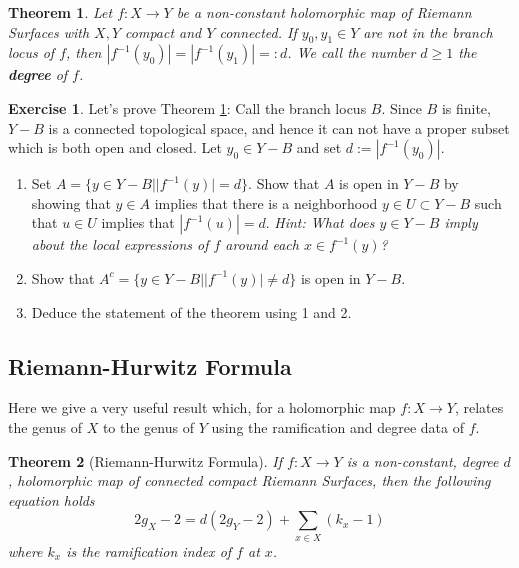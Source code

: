 \documentclass[12pt]{book}%
\theoremstyle{plain}
\newtheorem{theorem}{Theorem}[section]
\theoremstyle{definition}
\newtheorem{exercise}{Exercise}
\theoremstyle{remark}
\def\to{\rightarrow}
\begin{document}
\begin{theorem}
\label{degreeThm}
Let $f:X \to Y$ be a non-constant holomorphic map of Riemann Surfaces with $X,Y$ compact and $Y$ connected. If $y_0, y_1 \in Y$ are not in the branch locus of $f$, then $|f^{-1}(y_0)| = |f^{-1}(y_1)|=:d$. We call the number $d \geq 1$ the \textbf{degree} of $f$. 
\end{theorem}
\begin{exercise}
Let's prove Theorem \ref{degreeThm}: Call the branch locus $B$. Since $B$ is finite, $Y-B$ is a connected topological space, and hence it can not have a proper subset which is both open and closed. Let $y_0\in Y-B$ and set $d:=|f^{-1}(y_0)|$.
\begin{enumerate}
\item Set $A = \{y \in Y-B | |f^{-1}(y)| = d\}$. Show that $A$ is open in $Y-B$ by showing that $y\in A$ implies that there is a neighborhood $y\in U \subset Y-B$ such that $u \in U$ implies that $|f^{-1}(u)| = d$. \textit{Hint: What does $y\in Y-B$ imply about the local expressions of $f$ around each $x\in f^{-1}(y)$?}

\item Show that $A^c = \{y \in Y-B | |f^{-1}(y)| \neq d\}$ is open in $Y-B$.

\item Deduce the statement of the theorem using 1 and 2.
\end{enumerate}
\end{exercise}





\subsection{Riemann-Hurwitz Formula}

Here we give a very useful result which, for a holomorphic map $f:X \to Y$, relates the genus of $X$ to the genus of $Y$ using the ramification and degree data of $f$.

\begin{theorem}[Riemann-Hurwitz Formula]
\label{riemannHurwitzFormula}
If $f:X \to Y$ is a non-constant, degree $d$, holomorphic map of connected compact Riemann Surfaces, then the following equation holds
\[
2g_X-2 = d(2g_Y-2) + \sum_{x \in X} (k_x - 1)
\]
where $k_x$ is the ramification index of $f$ at $x$.
\end{theorem}
\end{document}
